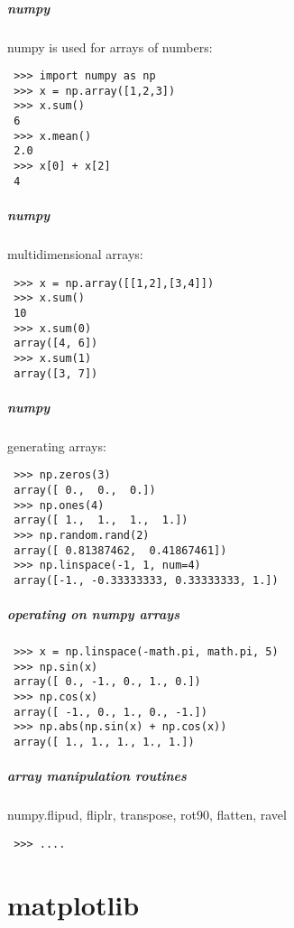 \documentclass[hyperref={colorlinks, linkcolor=blue, urlcolor=blue}]{beamer}
\begin{document}
\begin{frame}[fragile]
  \frametitle{numpy}
  numpy is used for arrays of numbers:
  \begin{lstlisting}
 >>> import numpy as np
 >>> x = np.array([1,2,3])
 >>> x.sum()
 6
 >>> x.mean()
 2.0
 >>> x[0] + x[2]
 4
  \end{lstlisting}
\end{frame}

\begin{frame}[fragile]
  \frametitle{numpy}
  multidimensional arrays:
  \begin{lstlisting}
 >>> x = np.array([[1,2],[3,4]])
 >>> x.sum()
 10
 >>> x.sum(0)
 array([4, 6])
 >>> x.sum(1)
 array([3, 7])
  \end{lstlisting}
\end{frame}

\begin{frame}[fragile]
  \frametitle{numpy}
  generating arrays:
  \begin{lstlisting}
 >>> np.zeros(3)
 array([ 0.,  0.,  0.])
 >>> np.ones(4)
 array([ 1.,  1.,  1.,  1.])
 >>> np.random.rand(2)
 array([ 0.81387462,  0.41867461])
 >>> np.linspace(-1, 1, num=4)
 array([-1., -0.33333333, 0.33333333, 1.])
  \end{lstlisting}
\end{frame}

\begin{frame}[fragile]
  \frametitle{operating on numpy arrays}
  \begin{lstlisting}
 >>> x = np.linspace(-math.pi, math.pi, 5)
 >>> np.sin(x)
 array([ 0., -1., 0., 1., 0.])
 >>> np.cos(x)
 array([ -1., 0., 1., 0., -1.])
 >>> np.abs(np.sin(x) + np.cos(x))
 array([ 1., 1., 1., 1., 1.])
  \end{lstlisting}
\end{frame}

\begin{frame}[fragile]
  \frametitle{array manipulation routines}
  numpy.flipud, fliplr, transpose, rot90, flatten, ravel
  \begin{lstlisting}
 >>> ....
  \end{lstlisting}
\end{frame}

\part{matplotlib} 
\end{document}
